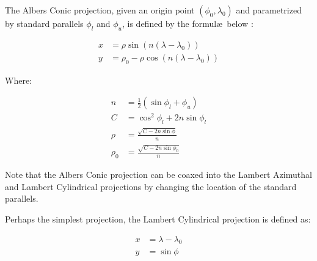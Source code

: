 
The Albers Conic projection, given an origin point $(\phi_0, \lambda_0)$
  and parametrized by standard parallels $\phi_l$ and $\phi_u$,
  is defined by the formul\ae\ below \cite{key:weisstein-albers}:

\def\th{ n \left( \lambda - \lambda_0 \right) }
\begin{align}
x &= \rho \sin ( \th ) \\
y &= \rho_0 - \rho \cos ( \th )
\end{align}

Where:

\begin{align*}
n &= \frac{1}{2} (\sin \phi_l + \phi_u) \\
C &= \cos^2 \phi_l + 2n\sin \phi_l \\
\rho &= \frac{
           \sqrt{ C - 2n \sin \phi }
         } { n } \\
\rho_0 &= \frac{
           \sqrt{ C - 2n \sin \phi_0 }
         } { n }
\end{align*}

Note that the Albers Conic projection can be coaxed into the Lambert Azimuthal
  and Lambert Cylindrical projections by changing the location of the standard
  parallels.

Perhaps the simplest projection, the Lambert Cylindrical projection is defined
  as:

\begin{align}
x &= \lambda - \lambda_0  \\
y &= \sin \phi
\end{align}

